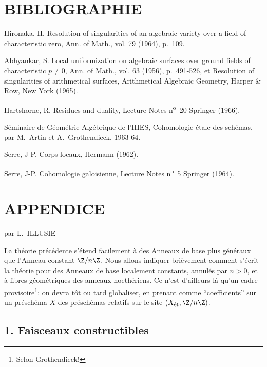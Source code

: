 \section*{BIBLIOGRAPHIE}

\begin{description}[leftmargin=2.5cm,style=nextline]
\item[{[2]}]
Hironaka, H. Resolution of singularities of an algebraic variety over a field of characteristic zero, Ann. of Math., vol. 79 (1964), p.~109.
\item[{[1]}] Abhyankar, S. Local uniformization on algebraic surfaces over ground fields of characteristic $p\ne0$, Ann. of Math., vol. 63 (1956), p.~491-526, et Resolution of singularities of arithmetical surfaces, Arithmetical Algebraic Geometry, Harper \& Row, New York (1965).
\item[{[H]}] Hartshorne, R. Residues and duality, Lecture Notes n\textsuperscript{o}~20 Springer (1966).
\item[{[SGAA]}] Séminaire de Géométrie Algébrique de l'IHES, Cohomologie étale des schémas, par M.~Artin et A.~Grothendieck, 1963-64.
\item[{[CL]}] Serre, J-P. Corps locaux, Hermann (1962).
\item[{[CG]}] Serre, J-P. Cohomologie galoisienne, Lecture Notes n\textsuperscript{o}~5 Springer (1964).
\end{description}

\section*{APPENDICE}
\begin{center}
par L.~ILLUSIE
\end{center}

La théorie précédente s'étend facilement à des Anneaux de base plus généraux que l'Anneau constant $\Z/n\Z$. Nous allons indiquer brièvement comment s'écrit la théorie pour des Anneaux de base localement constants, annulés par $n>0$, et à fibres géométriques des anneaux noethériens. Ce n'est d'ailleurs là qu'un cadre provisoire\footnote{Selon Grothendieck!}: on devra tôt ou tard globaliser, en prenant comme ``coefficients'' sur un préschéma $X$ des préschémas relatifs sur le site $(X_{\mathrm{\acute et}},\Z/n\Z)$.

\subsection*{1. Faisceaux constructibles}

